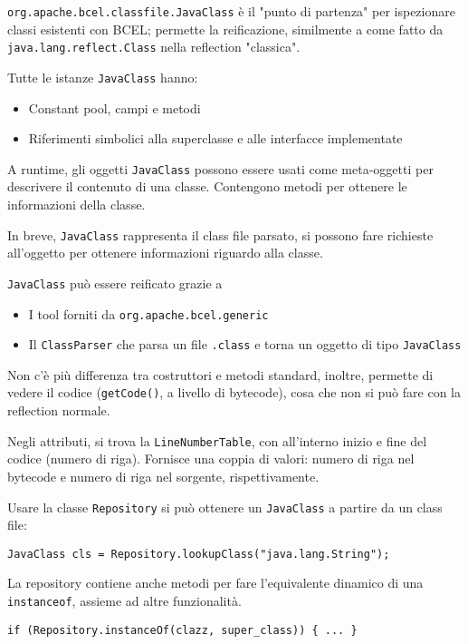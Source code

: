 \texttt{org.apache.bcel.classfile.JavaClass} è il "punto di partenza" per ispezionare classi esistenti con BCEL; permette la reificazione, similmente a come fatto da \texttt{java.lang.reflect.Class} nella reflection "classica".

Tutte le istanze \texttt{JavaClass} hanno:
\begin{itemize}
    \item Constant pool, campi e metodi

    \item Riferimenti simbolici alla superclasse e alle interfacce implementate
\end{itemize}
A runtime, gli oggetti \texttt{JavaClass} possono essere usati come meta-oggetti per descrivere il contenuto di una classe. Contengono metodi per ottenere le informazioni della classe.

In breve, \texttt{JavaClass} rappresenta il class file parsato, si possono fare richieste all'oggetto per ottenere informazioni riguardo alla classe.

\texttt{JavaClass} può essere reificato grazie a
\begin{itemize}
    \item I tool forniti da \texttt{org.apache.bcel.generic}

    \item Il \texttt{ClassParser} che parsa un file \texttt{.class} e torna un oggetto di tipo \texttt{JavaClass}
\end{itemize}

Non c'è più differenza tra costruttori e metodi standard, inoltre, permette di vedere il codice (\texttt{getCode()}, a livello di bytecode), cosa che non si può fare con la reflection normale.

Negli attributi, si trova la \texttt{LineNumberTable}, con all'interno inizio e fine del codice (numero di riga). Fornisce una coppia di valori: numero di riga nel bytecode e numero di riga nel sorgente, rispettivamente.

Usare la classe \texttt{Repository} si può ottenere un \texttt{JavaClass} a partire da un class file:
\begin{verbatim}
JavaClass cls = Repository.lookupClass("java.lang.String");
\end{verbatim}

La repository contiene anche metodi per fare l'equivalente dinamico di una \texttt{instanceof}, assieme ad altre funzionalità.
\begin{verbatim}
if (Repository.instanceOf(clazz, super_class)) { ... }
\end{verbatim}

